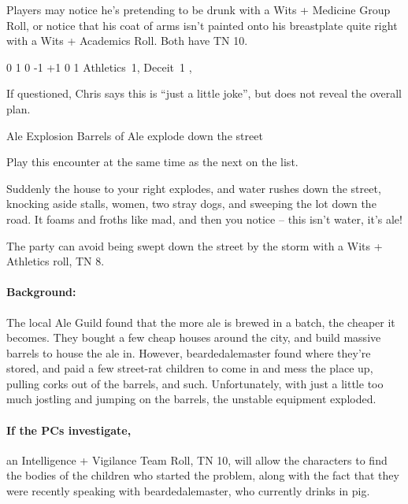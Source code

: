 \begin{multicols}{2}
Players may notice he's pretending to be drunk with a Wits + Medicine Group Roll, or notice that his coat of arms isn't painted onto his breastplate quite right with a Wits + Academics Roll.
Both have TN 10.


  {0}%
  {1}%
  {{0}%
  {-1}%
  {+1}}%
  {0}%
  {1}%
  {Athletics~1, Deceit~1}%
  {\longsword, \completeplate}%
  {\addtocounter{xpbonus}{-3}}

If questioned, Chris says this is ``just a little joke'', but does not reveal the overall plan.

{\squash Ale Explosion}%
{Barrels of Ale explode down the street}%

Play this encounter at the same time as the next on the list.

\begin{boxtext}

  Suddenly the house to your right explodes, and water rushes down the street, knocking aside stalls, women, two stray dogs, and sweeping the lot down the road.  It foams and froths like mad, and then you notice -- this isn't water, it's ale!

\end{boxtext}

The party can avoid being swept down the street by the storm with a Wits + Athletics roll, TN 8.

\paragraph{Background:} The local Ale Guild found that the more ale is brewed in a batch, the cheaper it becomes.
They bought a few cheap houses around the city, and build massive barrels to house the ale in.
However, \gls{beardedalemaster} found where they're stored, and paid a few street-rat children to come in and mess the place up, pulling corks out of the barrels, and such.
Unfortunately, with just a little too much jostling and jumping on the barrels, the unstable equipment exploded.

\paragraph{If the PCs investigate,}
an Intelligence + Vigilance Team Roll, TN 10, will allow the characters to find the bodies of the children who started the problem, along with the fact that they were recently speaking with \gls{beardedalemaster}, who currently drinks in \gls{pig}.%
\iftoggle{core}%
{\footnote{See the core rules, page \pageref{teamwork}, for Team Rolls.}}%
{}%


\end{multicols}
